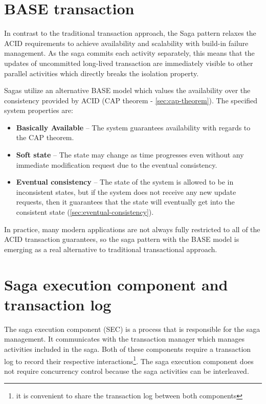 \documentclass[oneside,
  digital, %
  table,   %
  nolof,     %
  nolot,     %
]{fithesis3}
\begin{document}
\section{BASE transaction}

In contrast to the traditional transaction approach, the Saga pattern relaxes the ACID requirements to achieve availability and scalability with build-in failure management. As the saga commits each activity separately, this means that the updates of uncommitted long-lived transaction are immediately visible to other parallel activities \cite{trans_concept} which directly breaks the isolation property.

Sagas utilize an alternative BASE model \cite{life-beyond-dist-tran-helland, building-on-quicksand} which values the availability over the consistency provided by ACID (CAP theorem - \ref{sec:cap-theorem}). The specified system properties are:

\begin{itemize}
    \item \textbf{Basically Available} -- The system guarantees availability with regards to the CAP theorem.
    
    \item \textbf{Soft state} -- The state may change as time progresses even without any immediate modification request due to the eventual consistency.
    
    \item \textbf{Eventual consistency} -- The state of the system is allowed to be in inconsistent states, but if the system does not receive any new update requests, then it guarantees that the state will eventually get into the consistent state (\ref{sec:eventual-consistency}).
\end{itemize}

In practice, many modern applications are not always fully restricted to all of the ACID transaction guarantees, so the saga pattern with the BASE model is emerging as a real alternative to traditional transactional approach.

\section{Saga execution component and transaction log}

The saga execution component (SEC) is a process that is responsible for the saga management. It communicates with the transaction manager which manages activities included in the saga. Both of these components require a transaction log to record their respective interactions\footnote{it is convenient to share the transaction log between both components}. The saga execution component does not require  concurrency control because the saga activities can be interleaved.
\end{document}
